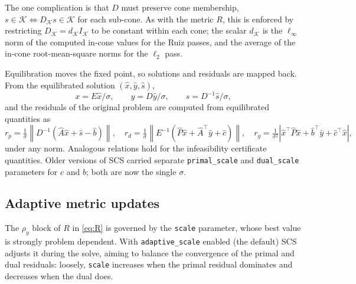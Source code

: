 \documentclass[11pt,a4paper]{article}
\newcommand{\K}{\mathcal{K}}
\newcommand{\tr}{^\top}
\theoremstyle{plain}
\begin{document}
The one complication is that $D$ must preserve cone membership,
$s \in \K \Leftrightarrow D_\K s \in \K$ for each sub-cone. As with the metric
$R$, this is enforced by restricting $D_\K = d_\K I_\K$ to be constant within
each cone; the scalar $d_\K$ is the $\ell_\infty$ norm of the computed in-cone
values for the Ruiz passes, and the average of the in-cone root-mean-square
norms for the $\ell_2$ pass.

Equilibration moves the fixed point, so solutions and residuals are mapped
back. From the equilibrated solution $(\hat x, \hat y, \hat s)$,
\begin{equation}\label{eq:unequil}
x = E\hat x/\sigma, \qquad y = D\hat y/\sigma, \qquad s = D^{-1}\hat s/\sigma,
\end{equation}
and the residuals of the original problem are computed from equilibrated
quantities as
\begin{equation}\label{eq:unequil-res}
r_p = \tfrac{1}{\sigma}\left\|D^{-1}(\hat A\hat x + \hat s - \hat b)\right\|,
\quad
r_d = \tfrac{1}{\sigma}\left\|E^{-1}(\hat P\hat x + \hat A\tr\hat y + \hat c)\right\|,
\quad
r_g = \tfrac{1}{\sigma^2}\left|\hat x\tr\hat P\hat x + \hat b\tr\hat y + \hat c\tr\hat x\right| ,
\end{equation}
under any norm. Analogous relations hold for the infeasibility certificate
quantities. Older versions of SCS carried separate \texttt{primal\_scale} and
\texttt{dual\_scale} parameters for $c$ and $b$; both are now the single
$\sigma$.

\subsection{Adaptive metric updates}\label{sec:adaptive}

The $\rho_y$ block of $R$ in \eqref{eq:R} is governed by the \texttt{scale}
parameter, whose best value is strongly problem dependent. With
\texttt{adaptive\_scale} enabled (the default) SCS adjusts it during the solve,
aiming to balance the convergence of the primal and dual residuals: loosely,
\texttt{scale} increases when the primal residual dominates and decreases when
the dual does.
\end{document}
